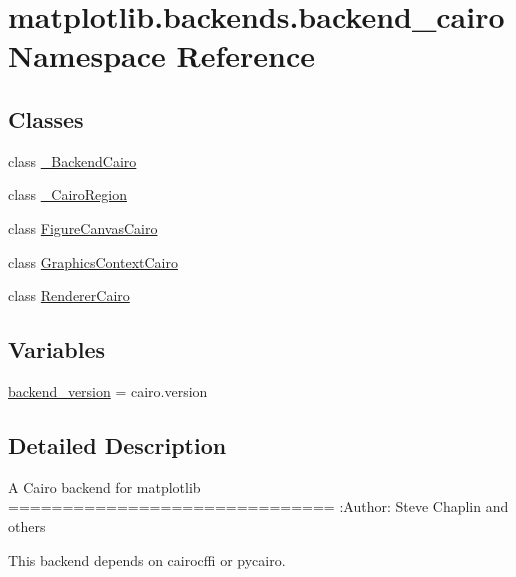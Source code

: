 \hypertarget{namespacematplotlib_1_1backends_1_1backend__cairo}{}\section{matplotlib.\+backends.\+backend\+\_\+cairo Namespace Reference}
\label{namespacematplotlib_1_1backends_1_1backend__cairo}
\subsection*{Classes}
\begin{DoxyCompactItemize}
\item 
class \hyperlink{classmatplotlib_1_1backends_1_1backend__cairo_1_1__BackendCairo}{\+\_\+\+Backend\+Cairo}
\item 
class \hyperlink{classmatplotlib_1_1backends_1_1backend__cairo_1_1__CairoRegion}{\+\_\+\+Cairo\+Region}
\item 
class \hyperlink{classmatplotlib_1_1backends_1_1backend__cairo_1_1FigureCanvasCairo}{Figure\+Canvas\+Cairo}
\item 
class \hyperlink{classmatplotlib_1_1backends_1_1backend__cairo_1_1GraphicsContextCairo}{Graphics\+Context\+Cairo}
\item 
class \hyperlink{classmatplotlib_1_1backends_1_1backend__cairo_1_1RendererCairo}{Renderer\+Cairo}
\end{DoxyCompactItemize}
\subsection*{Variables}
\begin{DoxyCompactItemize}
\item 
\hyperlink{namespacematplotlib_1_1backends_1_1backend__cairo_a7c49131328bc35cfebcc4cdf05dcd02b}{backend\+\_\+version} = cairo.\+version
\end{DoxyCompactItemize}


\subsection{Detailed Description}
\begin{DoxyVerb}A Cairo backend for matplotlib
==============================
:Author: Steve Chaplin and others

This backend depends on cairocffi or pycairo.
\end{DoxyVerb}
 

